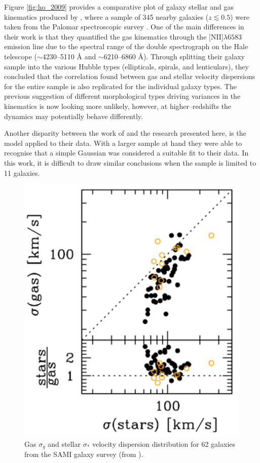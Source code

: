 \documentclass[12pt, twocolumn, nofootinbib]{revtex4-1}    %
\begin{document}
Figure \ref{fig:ho_2009} provides a comparative plot of galaxy stellar and gas kinematics produced by \cite{2009ApJ...699..638H}, where a sample of 345 nearby galaxies ($z\lesssim0.5$) were taken from the Palomar spectroscopic survey \citep{1995ApJS...98..477H, 1997ApJS..112..315H}. One of the main differences in their work is that they quantified the gas kinematics through the [NII]$\lambda6583$ emission line due to the spectral range of the double spectrograph on the Hale telescope ($\sim$4230--5110 {\AA} and $\sim$6210--6860 {\AA}). Through splitting their galaxy sample into the various Hubble types (ellipticals, spirals, and lenticulars), they concluded that the correlation found between gas and stellar velocity dispersions for the entire sample is also replicated for the individual galaxy types. The previous suggestion of different morphological types driving variances in the kinematics is now looking more unlikely, however, at higher--redshifts the dynamics may potentially behave differently. 

Another disparity between the work of \cite{2009ApJ...699..638H} and the research presented here, is the model applied to their data. With a larger sample at hand they were able to recognise that a simple Gaussian was considered a suitable fit to their data. In this work, it is difficult to draw similar conclusions when the sample is limited to 11 galaxies. 

\begin{figure}
\includegraphics[width=0.6\linewidth]{data/cortese_2010.pdf}
\caption{Gas $\sigma_g$ and stellar $\sigma_*$ velocity dispersion distribution for 62 galaxies from the SAMI galaxy survey (from \cite{2014ApJ...795L..37C}).}
\label{fig:cortese_2010}
\end{figure} 
\end{document}
